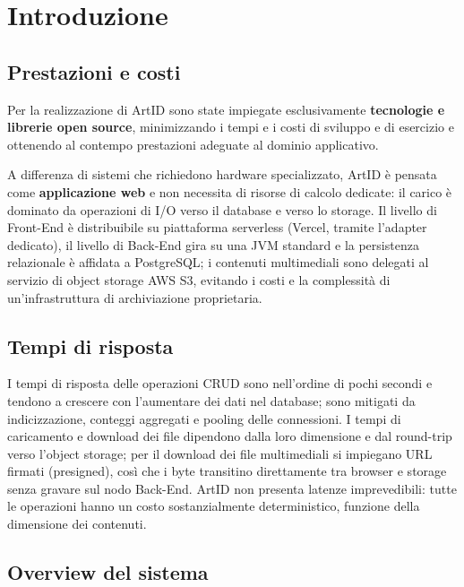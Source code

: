 \section{Introduzione}

\subsection{Prestazioni e costi}
Per la realizzazione di ArtID sono state impiegate esclusivamente \textbf{tecnologie e librerie open source}, minimizzando i tempi e i costi di sviluppo e di esercizio e ottenendo al contempo prestazioni adeguate al dominio applicativo.

A differenza di sistemi che richiedono hardware specializzato, ArtID è pensata come \textbf{applicazione web} e non necessita di risorse di calcolo dedicate: il carico è dominato da operazioni di I/O verso il database e verso lo storage. Il livello di Front-End è distribuibile su piattaforma serverless (Vercel, tramite l'adapter dedicato), il livello di Back-End gira su una JVM standard e la persistenza relazionale è affidata a PostgreSQL; i contenuti multimediali sono delegati al servizio di object storage AWS S3, evitando i costi e la complessità di un'infrastruttura di archiviazione proprietaria.

\subsection{Tempi di risposta}
I tempi di risposta delle operazioni CRUD sono nell'ordine di pochi secondi e tendono a crescere con l'aumentare dei dati nel database; sono mitigati da indicizzazione, conteggi aggregati e pooling delle connessioni. I tempi di caricamento e download dei file dipendono dalla loro dimensione e dal round-trip verso l'object storage; per il download dei file multimediali si impiegano URL firmati (presigned), così che i byte transitino direttamente tra browser e storage senza gravare sul nodo Back-End. ArtID non presenta latenze imprevedibili: tutte le operazioni hanno un costo sostanzialmente deterministico, funzione della dimensione dei contenuti.

\subsection{Overview del sistema}

